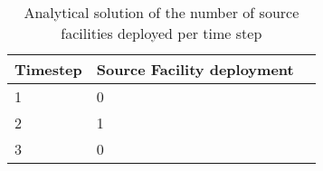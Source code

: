 \documentclass[12pt,letterpaper]{article}
\begin{document}
\begin{table}[H]
     \centering
    \begin{tabularx}{\textwidth}{bbb}
       \hline
       Timestep & Source Facility deployment  \\
       \hline
       1 & 0 \\
       2 & 1 \\
       3 & 0 \\
       \hline
    \end{tabularx}
    \caption {Analytical solution of the number of source facilities deployed per time step}
    \label{tab:test-NUdemand}
\end{table}

\begin{comment}
\subsubsection{\texttt{Reactor}}
\noindent
\textbf{Condition 1: All the reactors run at full capacity} \\
This is tested by determining the total number of time steps which both \texttt{Reactor}s are in operation, one \texttt{Reactor} is in operation or none is in operation. Based on the values of the analytical solution in Table \ref{tab:poweroutput}, there should be 2 time steps where both 
\texttt{Reactor}s are in operation, 6 time steps where only one \texttt{Reactor} is in operation and 2 time steps where no \texttt{Reactor}s are in operation. 

\noindent
\textbf{Condition 2: A new \texttt{Reactor} is deployed when the energy demand exceeds the energy produced by the current \texttt{Reactor}s} \\
This is tested by comparing the total number of \texttt{Reactor}s deployed to the analytical solution. Based on values of the analytical solution in Table \ref{tab:deployment}, in total 2 \texttt{Reactor}s were deployed.  

\noindent 
\textbf{Condition 3: A \texttt{Reactor} is decommissioned when the energy demand falls behind the output of the current \texttt{Reactor}s}

\subsubsection{\texttt{Enrichment}}
\noindent 
\textbf{Condition 1: The enriched uranium produced by \texttt{Enrichment} is equal to the analytic solution of the enriched uranium required by the \texttt{Reactor} for each time step} \\
This is tested by determining the total number of SWUs produced by the \texttt{Enrichment} facilities. These values are compared to the SWUs produced per time step in the analytical solution in Table \ref{tab:analytical}. 


\end{comment}
\end{document}
